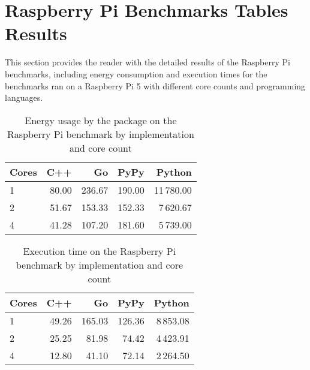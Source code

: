 \chapter{Raspberry Pi Benchmarks Tables Results}
\label{chap:appendix-rpi-benchmarks}

This section provides the reader with the detailed results of the Raspberry Pi benchmarks, including energy consumption and execution times for the benchmarks ran on a Raspberry Pi 5 with different core counts and programming languages.

\begin{table}[h]
    \centering
    \begin{tabular}{lrrrr}
        \hline
        Cores & C++    & Go      & PyPy         & Python      \\
        \hline
        1     & 80.00  & 236.67  & 190.00       & 11\,780.00  \\
        2     & 51.67  & 153.33  & 152.33       &  7\,620.67  \\
        4     & 41.28  & 107.20  & 181.60       &  5\,739.00  \\
        \hline
    \end{tabular}
\caption[Raspberry Pi - Package energy consumption]{Energy usage by the package on the Raspberry Pi benchmark by implementation and core count}
\label{tab:rpi-power-consumption}
\end{table}

\begin{table}[h]
    \centering
    \begin{tabular}{lrrrr}
        \hline
        Cores & C++    & Go      & PyPy         & Python      \\
        \hline
        1     & 49.26  & 165.03  & 126.36       & 8\,853.08   \\
        2     & 25.25  &  81.98  &  74.42       & 4\,423.91   \\
        4     & 12.80  &  41.10  &  72.14       & 2\,264.50   \\
        \hline
    \end{tabular}
\caption[Raspberry Pi - Execution Time]{Execution time on the Raspberry Pi benchmark by implementation and core count}
\label{tab:rpi-time-execution}
\end{table}


